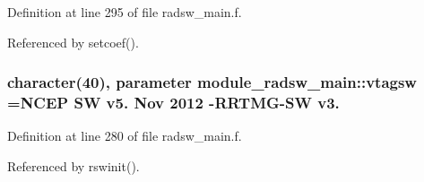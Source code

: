 Definition at line 295 of file radsw\+\_\+main.\+f.



Referenced by setcoef().

\subsubsection[{\texorpdfstring{vtagsw}{vtagsw}}]{\setlength{\rightskip}{0pt plus 5cm}character(40), parameter module\+\_\+radsw\+\_\+main\+::vtagsw =\textquotesingle{}N\+C\+EP SW v5. Nov 2012 -\/R\+R\+T\+MG-\/SW v3. \textquotesingle{}\hspace{0.3cm}{\ttfamily [private]}}\hypertarget{namespacemodule__radsw__main_a93334abce2ca8bfdcdfe5edd4ae1f093}{}\label{namespacemodule__radsw__main_a93334abce2ca8bfdcdfe5edd4ae1f093}


Definition at line 280 of file radsw\+\_\+main.\+f.



Referenced by rswinit().

